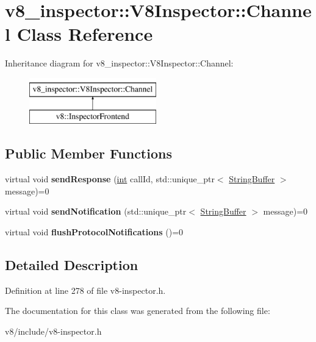 \hypertarget{classv8__inspector_1_1V8Inspector_1_1Channel}{}\section{v8\+\_\+inspector\+:\+:V8\+Inspector\+:\+:Channel Class Reference}
\label{classv8__inspector_1_1V8Inspector_1_1Channel}
Inheritance diagram for v8\+\_\+inspector\+:\+:V8\+Inspector\+:\+:Channel\+:\begin{figure}[H]
\begin{center}
\leavevmode
\includegraphics[height=2.000000cm]{classv8__inspector_1_1V8Inspector_1_1Channel}
\end{center}
\end{figure}
\subsection*{Public Member Functions}
\begin{DoxyCompactItemize}
\item 
\mbox{\label{classv8__inspector_1_1V8Inspector_1_1Channel_ad83740738d43c5ecadca3e3edfe44e65}} 
virtual void {\bfseries send\+Response} (\mbox{\hyperlink{classint}{int}} call\+Id, std\+::unique\+\_\+ptr$<$ \mbox{\hyperlink{classv8__inspector_1_1StringBuffer}{String\+Buffer}} $>$ message)=0
\item 
\mbox{\label{classv8__inspector_1_1V8Inspector_1_1Channel_ab710f81284b5c7a2b75f7b187ddf9ca1}} 
virtual void {\bfseries send\+Notification} (std\+::unique\+\_\+ptr$<$ \mbox{\hyperlink{classv8__inspector_1_1StringBuffer}{String\+Buffer}} $>$ message)=0
\item 
\mbox{\label{classv8__inspector_1_1V8Inspector_1_1Channel_ac30623e11f5b55b76d8a9cc3c007b191}} 
virtual void {\bfseries flush\+Protocol\+Notifications} ()=0
\end{DoxyCompactItemize}


\subsection{Detailed Description}


Definition at line 278 of file v8-\/inspector.\+h.



The documentation for this class was generated from the following file\+:\begin{DoxyCompactItemize}
\item 
v8/include/v8-\/inspector.\+h\end{DoxyCompactItemize}
